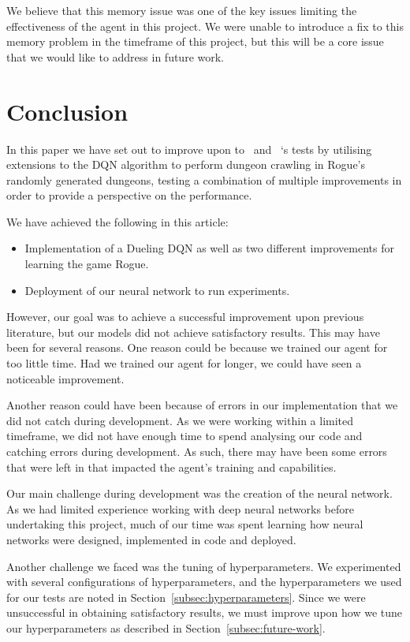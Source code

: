 \documentclass[12pt,a4paper]{article}
\begin{document}
    We believe that this memory issue was one of the key issues limiting the effectiveness of the agent in this project.
    We were unable to introduce a fix to this memory problem in the timeframe of this project,
    but this will be a core issue that we would like to address in future work.

    \section{Conclusion}\label{sec:conclusion}
    In this paper we have set out to improve upon to~\citet{asperti18} and ~\citet{kanagawa19}`s tests by utilising extensions to the DQN algorithm
    to perform dungeon crawling in Rogue's randomly generated dungeons, testing a combination of multiple improvements in order to
    provide a perspective on the performance.

    We have achieved the following in this article:
    \begin{itemize}
        \item Implementation of a Dueling DQN as well as two different improvements for learning the game Rogue.
        \item Deployment of our neural network to run experiments.
    \end{itemize}

    However, our goal was to achieve a successful improvement upon previous literature, but our models did not achieve satisfactory results.
    This may have been for several reasons.
    One reason could be because we trained our agent for too little time.
    Had we trained our agent for longer, we could have seen a noticeable improvement.

    Another reason could have been because of errors in our implementation that we did not catch during development.
    As we were working within a limited timeframe, we did not have enough time to spend analysing our code and catching
    errors during development.
    As such, there may have been some errors that were left in that impacted the agent's training and capabilities.

    Our main challenge during development was the creation of the neural network.
    As we had limited experience working with deep neural networks before undertaking this project, much of our time was spent
    learning how neural networks were designed, implemented in code and deployed.

    Another challenge we faced was the tuning of hyperparameters.
    We experimented with several configurations of hyperparameters, and the hyperparameters we used for our tests are noted in Section~\ref{subsec:hyperparameters}.
    Since we were unsuccessful in obtaining satisfactory results, we must improve upon how we tune our hyperparameters as described in Section~\ref{subsec:future-work}.
\end{document}

